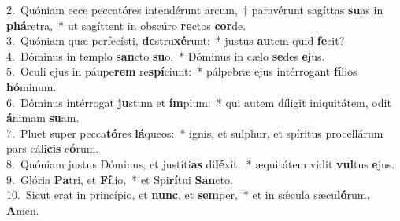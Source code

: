 {2.~}Quóniam ecce peccatóres intendérunt arcum,~† paravérunt sagíttas \textbf{su}as in \textbf{phá}retra,~* ut sagíttent in obscúro \textbf{re}ctos \textbf{cor}de.\\
{3.~}Quóniam quæ perfecísti, \textbf{de}stru\textbf{xé}runt:~* justus \textbf{au}tem quid \textbf{fe}cit?\\
{4.~}Dóminus in templo \textbf{san}cto \textbf{su}o,~* Dóminus in cælo \textbf{se}des \textbf{e}jus.\\
{5.~}Oculi ejus in páupe\textbf{rem} re\textbf{spí}ciunt:~* pálpebræ ejus intérrogant \textbf{fí}lios \textbf{hó}minum.\\
{6.~}Dóminus intérrogat \textbf{ju}stum et \textbf{ím}pium:~* qui autem díligit iniquitátem, odit \textbf{á}nimam \textbf{su}am.\\
{7.~}Pluet super pecca\textbf{tó}res \textbf{lá}queos:~* ignis, et sulphur, et spíritus procellárum pars cáli\textbf{cis} e\textbf{ó}rum.\\
{8.~}Quóniam justus Dóminus, et justíti\textbf{as} di\textbf{lé}xit:~* æquitátem vidit \textbf{vul}tus \textbf{e}jus.\\
{9.~}Glória \textbf{Pa}tri, et \textbf{Fí}lio,~* et Spi\textbf{rí}tui \textbf{San}cto.\\
{10.~}Sicut erat in princípio, et \textbf{nunc}, et \textbf{sem}per,~* et in sǽcula sæcu\textbf{ló}rum. \textbf{A}men.\\
